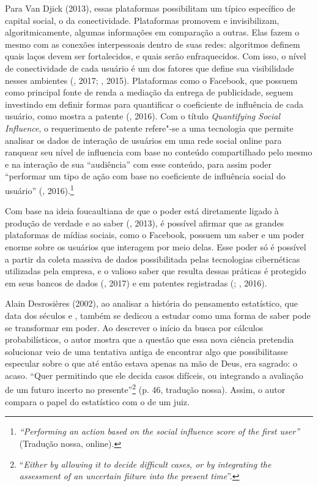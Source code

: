 Para Van Djick (2013), essas plataformas possibilitam um típico
específico de capital social, o da conectividade. Plataformas promovem e
invisibilizam, algoritmicamente, algumas informações em comparação a
outras. Elas fazem o mesmo com as conexões interpessoais dentro de suas
redes: algoritmos definem quais laços devem ser fortalecidos, e quais
serão enfraquecidos. Com isso, o nível de conectividade de cada usuário
é um dos fatores que define sua visibilidade nesses ambientes (,
2017; , 2015). Plataformas como o Facebook, que possuem como
principal fonte de renda a mediação da entrega de publicidade, seguem
investindo em definir formas para quantificar o coeficiente de
influência de cada usuário, como mostra a patente 
(, 2016). Com o título \emph{Quantifying Social Influence}, o
requerimento de patente refere"-se a uma tecnologia que permite analisar
os dados de interação de usuários em uma rede social online para
ranquear seu nível de influencia com base no conteúdo compartilhado pelo
mesmo e na interação de sua ``audiência'' com esse conteúdo, para assim
poder ``performar um tipo de ação com base no coeficiente de influência
social do usuário'' (, 2016).\footnote{\emph{``Performing an action based on the social influence score of the first user''} (Tradução nossa, online).}

Com base na ideia foucaultiana de que o poder está diretamente ligado à
produção de verdade e ao saber (, 2013),
é possível afirmar que as grandes plataformas de mídias sociais, como o
Facebook, possuem um saber e um poder enorme sobre os usuários que
interagem por meio delas. Esse poder só é possível a partir da coleta
massiva de dados possibilitada pelas tecnologias cibernéticas utilizadas
pela empresa, e o valioso saber que resulta dessas práticas é protegido
em seus bancos de dados (, 2017) e em patentes registradas
(; , 2016).

Alain Desrosières (2002), ao analisar a história do pensamento estatístico, que data dos séculos
 e , também se dedicou a estudar como uma forma de saber pode
se transformar em poder. Ao descrever o início da busca por cálculos
probabilísticos, o autor mostra que a questão que essa nova ciência
pretendia solucionar veio de uma tentativa antiga de encontrar algo que
possibilitasse especular sobre o que até então estava apenas na mão de
Deus, era sagrado: o acaso. ``Quer permitindo que ele decida casos
difíceis, ou integrando a avaliação de um futuro incerto no
presente''\footnote{``\emph{Either by allowing it to decide difficult cases,
  or by integrating the assessment of an uncertain fiiture into the
  present time}''.} (p. 46, tradução nossa). Assim, o autor compara o papel
do estatístico com o de um juiz.

